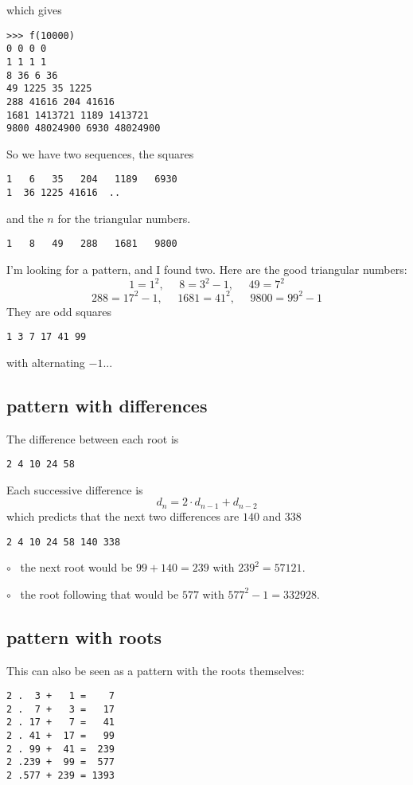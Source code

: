 \documentclass[11pt, oneside]{article}
\begin{document}
which gives

\begin{verbatim}
>>> f(10000)
0 0 0 0
1 1 1 1
8 36 6 36
49 1225 35 1225
288 41616 204 41616
1681 1413721 1189 1413721
9800 48024900 6930 48024900
\end{verbatim}

So we have two sequences, the squares
\begin{verbatim}
1   6   35   204   1189   6930
1  36 1225 41616  ..
\end{verbatim}
and the $n$ for the triangular numbers.
\begin{verbatim}
1   8   49   288   1681   9800
\end{verbatim}

I'm looking for a pattern, and I found two.  Here are the good triangular numbers:
\[ 1 = 1^2, \ \ \ \ \ \ 8 = 3^2 - 1, \ \ \ \ \ \ 49 = 7^2 \]
\[ 288 = 17^2 - 1, \ \ \ \ \ \ 1681 = 41^2, \ \ \ \ \ \ 9800 = 99^2 - 1 \]
They are odd squares 
\begin{verbatim}
1 3 7 17 41 99
\end{verbatim}
with alternating $-1$... 
 
\subsection*{pattern with differences}

The difference between each root is

\begin{verbatim}
2 4 10 24 58 
\end{verbatim}

Each successive difference is 
\[ d_n = 2 \cdot d_{n-1} + d_{n-2} \]
which predicts that the next two differences are $140$ and $338$

\begin{verbatim}
2 4 10 24 58 140 338
\end{verbatim}

$\circ$ \ the next root would be $99 + 140 = 239$ with $239^2 = 57121$. 

$\circ$ \ the root following that would be $577$ with $577^2 - 1 = 332928$.

\subsection*{pattern with roots}
This can also be seen as a pattern with the roots themselves:
\begin{verbatim}
2 .  3 +   1 =    7
2 .  7 +   3 =   17
2 . 17 +   7 =   41
2 . 41 +  17 =   99
2 . 99 +  41 =  239
2 .239 +  99 =  577
2 .577 + 239 = 1393
\end{verbatim}
\end{document}

